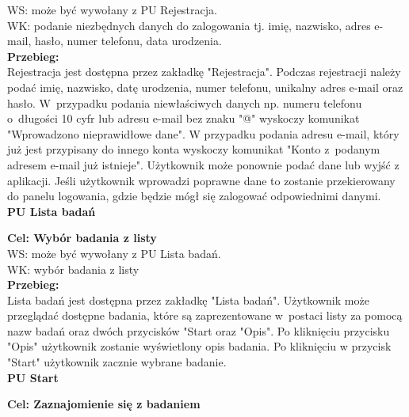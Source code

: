 \documentclass[12pt, letterpaper]{article}
\begin{document}
		WS: może być wywołany z PU Rejestracja.\\
		
		WK: podanie niezbędnych danych do zalogowania tj. imię, nazwisko, adres e-mail, hasło, numer telefonu, data urodzenia.\\
		
		\textbf{Przebieg:}\\
		Rejestracja jest dostępna przez zakładkę "Rejestracja". Podczas rejestracji należy podać imię, nazwisko, datę urodzenia, numer telefonu, unikalny adres e-mail oraz hasło. W~przypadku podania niewłaściwych danych np. numeru telefonu o~długości 10 cyfr lub adresu e-mail bez znaku "@" wyskoczy komunikat "Wprowadzono nieprawidłowe dane". W przypadku podania adresu e-mail, który już jest przypisany do innego konta wyskoczy komunikat "Konto z~podanym adresem e-mail już istnieje". Użytkownik może ponownie podać dane lub wyjść z aplikacji. Jeśli użytkownik wprowadzi poprawne dane to zostanie przekierowany do panelu logowania, gdzie będzie mógł się zalogować odpowiednimi danymi. \\
		
		
		\textbf{PU Lista badań}
		
		\quad
		
		\textbf{Cel: Wybór badania z listy}\\
		
		WS: może być wywołany z PU Lista badań.\\
		
		WK: wybór badania z listy\\
		
		\textbf{Przebieg:}\\
		Lista badań jest dostępna przez zakładkę "Lista badań". Użytkownik może przeglądać dostępne badania, które są zaprezentowane w~postaci listy za pomocą nazw badań oraz dwóch przycisków "Start oraz "Opis". Po kliknięciu przycisku "Opis" użytkownik zostanie wyświetlony opis badania. Po kliknięciu w przycisk "Start" użytkownik zacznie wybrane badanie. \\
		
		
		\textbf{PU Start}
		
		\quad
		
		\textbf{Cel: Zaznajomienie się z badaniem}\\
		
\end{document}
